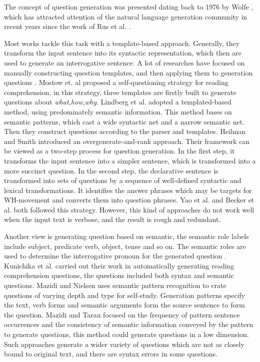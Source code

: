 \documentclass[runningheads,UTF8,article]{comsis2}
\newcommand\revised[1]{{\color{red} #1}}
\begin{document}
	
	The concept of question generation was presented dating back to 1976 by Wolfe \cite{wolfe},	which has attracted attention of the natural language generation community in recent years since the work of Rus et al. \cite{rus2010first}.
	
	
	Most works tackle this task with a template-based approach. Generally, they transform the input sentence into its syntactic representation, which then are used to generate an interrogative sentence. A lot of researches have focused on manually constructing question templates, and then applying them to generation questions \cite{mostow2009generating,lindberg2013generating,heilman2010good}. 
	Mostow et. al \cite{mostow2009generating} proposed a self-questioning strategy for \revised{reading comprehension}, in this strategy, three templates are firstly built to generate questions about \emph{what,how,why}. Lindberg et al.\cite{lindberg2013generating} adopted a templated-based method, using predominately semantic information.
	This method bases on semantic patterns, which cast a wide syntactic net and a narrow semantic net. Then they construct questions according to the parser and templates. Heilman and Smith \cite{heilman2010good} introduced an overgenerate-and-rank approach. \revised{Their framework can be viewed as a two-step process for question generation.  In the first step, it transforms the input sentence into a simpler sentence, which is transformed into a more succinct question. In the second step, the declarative sentence is transformed into sets of questions by a sequence of well-defined syntactic and lexical transformations. It identifies the answer phrases which may be targets for WH-movement and converts them into question phrases}. Yao et al. \cite{yao} and Becker et al.\cite{becker} both followed this strategy. However, this kind of approaches do not work well when the input text is verbose, and the result is rough and redundant.
	
	
	
	Another view is generating question based on semantic, the semantic role labels include subject, predicate verb, object, tense and so on. The semantic roles are used to determine the interrogative pronoun for the generated question \cite{Kunichika2001AutomatedQG,infusing,mazidi2014linguistic}. Kunichika et al. \cite{Kunichika2001AutomatedQG} carried out their work in automatically generating reading comprehension questions, the questions included both syntax and semantic questions.
	Mazidi and Nielsen \cite{mazidi2014linguistic} uses semantic pattern recognition to crate questions of varying depth and type for self-study. Generation patterns specify the text, verb forms and semantic arguments form the source sentence to form the question. Mazidi and Tarau \cite{infusing} focused on the frequency of pattern sentence occurrences and the consistency of semantic information conveyed by the pattern to generate questions, this method could generate questions in a low dimension. Such approaches generate a wider variety of questions which are not as closely bound to original text, and there are syntax errors in some questions.
	
\end{document}
